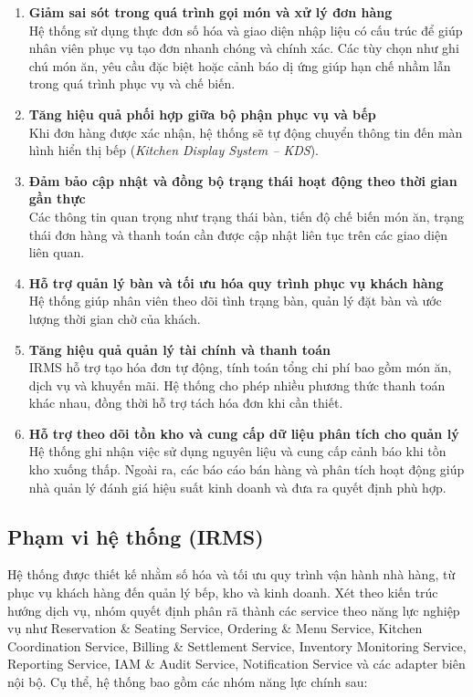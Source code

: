 \begin{enumerate}

\item \textbf{Giảm sai sót trong quá trình gọi món và xử lý đơn hàng} \\
Hệ thống sử dụng thực đơn số hóa và giao diện nhập liệu có cấu trúc để giúp nhân viên phục vụ tạo đơn nhanh chóng và chính xác. Các tùy chọn như ghi chú món ăn, yêu cầu đặc biệt hoặc cảnh báo dị ứng giúp hạn chế nhầm lẫn trong quá trình phục vụ và chế biến.

\item \textbf{Tăng hiệu quả phối hợp giữa bộ phận phục vụ và bếp} \\
Khi đơn hàng được xác nhận, hệ thống sẽ tự động chuyển thông tin đến màn hình hiển thị bếp (\textit{Kitchen Display System -- KDS}). 

\item \textbf{Đảm bảo cập nhật và đồng bộ trạng thái hoạt động theo thời gian gần thực} \\
Các thông tin quan trọng như trạng thái bàn, tiến độ chế biến món ăn, trạng thái đơn hàng và thanh toán cần được cập nhật liên tục trên các giao diện liên quan. 

\item \textbf{Hỗ trợ quản lý bàn và tối ưu hóa quy trình phục vụ khách hàng} \\
Hệ thống giúp nhân viên theo dõi tình trạng bàn, quản lý đặt bàn và ước lượng thời gian chờ của khách. 

\item \textbf{Tăng hiệu quả quản lý tài chính và thanh toán} \\
IRMS hỗ trợ tạo hóa đơn tự động, tính toán tổng chi phí bao gồm món ăn, dịch vụ và khuyến mãi. Hệ thống cho phép nhiều phương thức thanh toán khác nhau, đồng thời hỗ trợ tách hóa đơn khi cần thiết.

\item \textbf{Hỗ trợ theo dõi tồn kho và cung cấp dữ liệu phân tích cho quản lý} \\
Hệ thống ghi nhận việc sử dụng nguyên liệu và cung cấp cảnh báo khi tồn kho xuống thấp. Ngoài ra, các báo cáo bán hàng và phân tích hoạt động giúp nhà quản lý đánh giá hiệu suất kinh doanh và đưa ra quyết định phù hợp.

\end{enumerate}

\subsection{Phạm vi hệ thống (IRMS)}
Hệ thống được thiết kế nhằm số hóa và tối ưu quy trình vận hành nhà hàng, từ phục vụ khách hàng đến quản lý bếp, kho và kinh doanh. Xét theo kiến trúc hướng dịch vụ, nhóm quyết định phân rã thành các service theo năng lực nghiệp vụ như \textsf{Reservation \& Seating Service}, \textsf{Ordering \& Menu Service}, \textsf{Kitchen Coordination Service}, \textsf{Billing \& Settlement Service}, \textsf{Inventory Monitoring Service}, \textsf{Reporting Service}, \textsf{IAM \& Audit Service}, \textsf{Notification Service} và các adapter biên nội bộ. Cụ thể, hệ thống bao gồm các nhóm năng lực chính sau:


